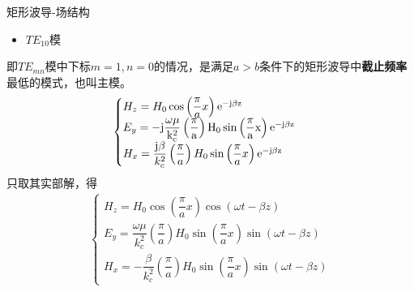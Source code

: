 \begin{frame}{矩形波导-场结构}
    \begin{itemize}
        \item $TE_{10}模$
    \end{itemize}
    即$TE_{mn}$模中下标$m=1,n=0$的情况，是满足$a>b$条件下的矩形波导中\textbf{截止频率}最低的模式，也叫主模。
    \begin{align*}
        \begin{cases}
            H_z=H_0\cos\left(\dfrac{\pi}{a}x\right)\rm{e}^{-\rm{j}\beta z}                                                           \\
            E_y=-\rm{j}\dfrac{\omega\mu}{k_c^2}\left(\dfrac{\pi}{a}\right)H_0\sin\left(\dfrac{\pi}{a}x\right)\rm{e}^{-\rm{j}\beta z} \\
            H_x=\dfrac{\rm{j}\beta}{k_c^2}\left(\dfrac{\pi}{a}\right)H_0\sin\left(\dfrac{\pi}{a}x\right)\rm{e}^{-\rm{j}\beta z}
        \end{cases}
    \end{align*}
    只取其实部解，得
    \begin{align*}
        \begin{cases}
            H_z=H_0\cos\left(\dfrac{\pi}{a}x\right)\cos(\omega t-\beta z)                                                    \\
            E_y=\dfrac{\omega\mu}{k_c^2}\left(\dfrac{\pi}{a}\right)H_0\sin\left(\dfrac{\pi}{a}x\right)\sin(\omega t-\beta z) \\
            H_x=-\dfrac{\beta}{k_c^2}\left(\dfrac{\pi}{a}\right)H_0\sin\left(\dfrac{\pi}{a}x\right)\sin(\omega t-\beta z)
        \end{cases}
    \end{align*}
\end{frame}

